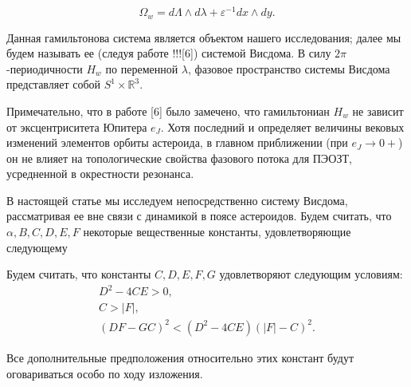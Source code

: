 \begin{equation}
\Omega_w = d\Lambda \wedge d\lambda + \varepsilon^{-1} dx \wedge dy.
\label{ow}
\end{equation}

Данная гамильтонова система является объектом нашего исследования; далее мы будем называть ее (следуя работе !!![6]) системой Висдома. В силу $ 2\pi $-периодичности $ H_w $ по переменной $ \lambda $, фазовое пространство системы Висдома представляет собой $ S^1 \times \mathbb{R}^3 $.

Примечательно, что в работе [6] было замечено, что гамильтониан $ H_w $ не зависит от эксцентриситета Юпитера $ e_J $. Хотя последний и определяет величины вековых изменений элементов орбиты астероида, в главном приближении (при $ e_J \rightarrow 0+ $) он не влияет на топологические свойства фазового потока для ПЭОЗТ, усредненной в окрестности резонанса.

В настоящей статье мы исследуем непосредственно систему Висдома, рассматривая ее вне связи с динамикой в поясе астероидов. Будем считать, что $ \alpha, B, C, D, E, F $ некоторые вещественные константы, удовлетворяющие следующему

\begin{hyp}
Будем считать, что константы $C,D,E,F,G$ удовлетворяют следующим условиям:
\begin{subequations}
\begin{gather}
D^2 - 4CE > 0, \label{hypb} \\
C > |F|, \label{hypa} \\
(DF - GC)^2 < (D^2 - 4CE) (|F| - C)^2. \label{hypc}
\end{gather}
\end{subequations}
\end{hyp}


Все дополнительные предположения относительно этих констант будут оговариваться особо по ходу изложения.